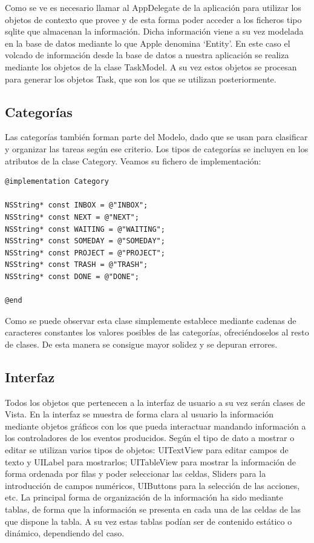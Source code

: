\documentclass[parskip=half*]{scrartcl}
\begin{document}
Como se ve es necesario llamar al AppDelegate de la aplicaci\'on para utilizar los objetos de contexto que provee y de esta forma poder acceder a los ficheros tipo sqlite que almacenan la informaci\'on. Dicha informaci\'on viene a su vez modelada en la base de datos mediante lo que Apple denomina `Entity'. En este caso el volcado de informaci\'on desde la base de datos a nuestra aplicaci\'on se realiza mediante los objetos de la clase TaskModel. A su vez estos objetos se procesan para generar los objetos Task, que son los que se utilizan posteriormente.



\subsection{Categor\'ias}

Las categor\'ias tambi\'en forman parte del Modelo, dado que se usan para clasificar y organizar las tareas seg\'un ese criterio. Los tipos de categor\'ias se incluyen en los atributos de la clase Category. Veamos su fichero de implementaci\'on:

\begin{lstlisting}
@implementation Category

NSString* const INBOX = @"INBOX";
NSString* const NEXT = @"NEXT";
NSString* const WAITING = @"WAITING";
NSString* const SOMEDAY = @"SOMEDAY";
NSString* const PROJECT = @"PROJECT";
NSString* const TRASH = @"TRASH";
NSString* const DONE = @"DONE";

@end
\end{lstlisting}

Como se puede observar esta clase simplemente establece mediante cadenas de caracteres constantes los valores posibles de las categor\'ias, ofreci\'endoselos al resto de clases. De esta manera se consigue mayor solidez y se depuran errores.

\subsection{Interfaz}

Todos los objetos que pertenecen a la interfaz de usuario a su vez ser\'an clases de Vista. En la interfaz se muestra de forma clara al usuario la informaci\'on mediante objetos gr\'aficos con los que pueda interactuar mandando informaci\'on a los controladores de los eventos producidos. Seg\'un el tipo de dato a mostrar o editar se utilizan varios tipos de objetos: UITextView para editar campos de texto y UILabel para mostrarlos; UITableView para mostrar la informaci\'on de forma ordenada por filas y poder seleccionar las celdas, Sliders para la introducci\'on de campos num\'ericos, UIButtons para la selecci\'on de las acciones, etc. La principal forma de organizaci\'on de la informaci\'on ha sido mediante tablas, de forma que la informaci\'on se presenta en cada una de las celdas de las que dispone la tabla. A su vez estas tablas pod\'ian ser de contenido est\'atico o din\'amico, dependiendo del caso.
\end{document}
